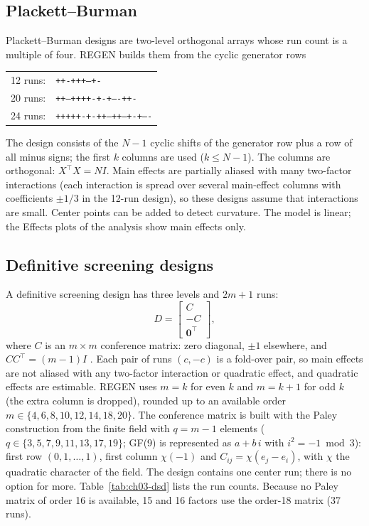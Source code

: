 \subsection{Plackett--Burman}
Plackett--Burman designs \citep{plackett1946} are two-level orthogonal arrays whose run count is a multiple of four.
REGEN builds them from the cyclic generator rows
\begin{center}\small
\begin{tabular}{@{}rl@{}}
12 runs: & \texttt{++-+++---+-}\\
20 runs: & \texttt{++--++++-+-+----++-}\\
24 runs: & \texttt{+++++-+-++--++--+-+----}
\end{tabular}
\end{center}
The design consists of the $N-1$ cyclic shifts of the generator row plus a row of all minus signs; the first $k$
columns are used ($k \le N-1$). The columns are orthogonal: $X^\top X = N I$. Main effects are partially aliased
with many two-factor interactions (each interaction is spread over several main-effect columns with coefficients
$\pm 1/3$ in the 12-run design), so these designs assume that interactions are small. Center points can be added to
detect curvature. The model is linear; the Effects plots of the analysis show main effects only.

\subsection{Definitive screening designs}
A definitive screening design \citep{jones2011} has three levels and $2m+1$ runs:
\begin{equation}
D = \begin{bmatrix} C \\ -C \\ \mathbf{0}^\top \end{bmatrix},
\label{eq:ch03-dsd}
\end{equation}
where $C$ is an $m \times m$ conference matrix: zero diagonal, $\pm 1$ elsewhere, and $C C^\top = (m-1) I$
\citep{xiao2012}. Each pair of runs $(c, -c)$ is a fold-over pair, so main effects are not aliased with any
two-factor interaction or quadratic effect, and quadratic effects are estimable. REGEN uses $m = k$ for even $k$
and $m = k+1$ for odd $k$ (the extra column is dropped), rounded up to an available order
$m \in \{4, 6, 8, 10, 12, 14, 18, 20\}$. The conference matrix is built with the Paley construction
\citep{paley1933} from the finite field with $q = m-1$ elements ($q \in \{3, 5, 7, 9, 11, 13, 17, 19\}$; GF(9) is
represented as $a + b\,i$ with $i^2 = -1 \bmod 3$): first row $(0, 1, \dots, 1)$, first column $\chi(-1)$ and
$C_{ij} = \chi(e_j - e_i)$, with $\chi$ the quadratic character of the field. The design contains one center run;
there is no option for more. Table~\ref{tab:ch03-dsd} lists the run counts. Because no Paley matrix of order 16 is
available, 15 and 16 factors use the order-18 matrix (37 runs).

